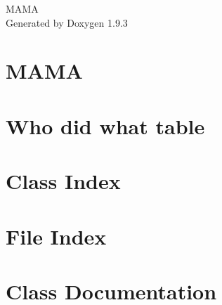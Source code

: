 \documentclass[twoside]{book}
\newcommand{\+}{\discretionary{\mbox{\scriptsize$\hookleftarrow$}}{}{}}
\newcommand{\clearemptydoublepage}{%
    \newpage{\pagestyle{empty}\cleardoublepage}%
  }
\begin{document}
  \raggedbottom
    \hypersetup{pageanchor=false,
                bookmarksnumbered=true,
                pdfencoding=unicode
               }
  \begin{titlepage}
  \vspace*{7cm}
  \begin{center}%
  {\Large MAMA}\\
  \vspace*{1cm}
  {\large Generated by Doxygen 1.9.3}\\
  \end{center}
  \end{titlepage}
  \clearemptydoublepage
  \tableofcontents
  \clearemptydoublepage
  \hypersetup{pageanchor=true}
\chapter{MAMA}
\label{md__home_maximillian_Desktop_MAMA_README}

\chapter{Who did what table}
\label{md__home_maximillian_Desktop_MAMA_WhoDidWhat}

\chapter{Class Index}

\chapter{File Index}

\chapter{Class Documentation}























\end{document}

